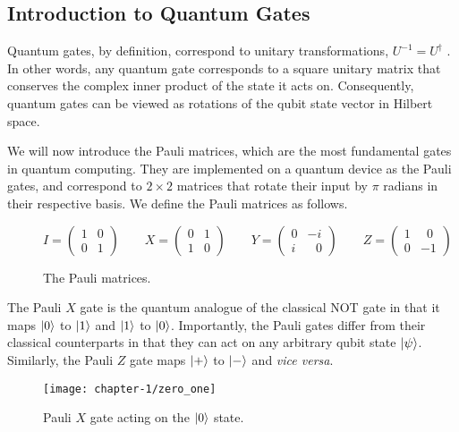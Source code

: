 \subsection{Introduction to Quantum Gates}%
\label{quantum-gates}

Quantum gates, by definition, correspond to unitary transformations, $U^{-1} = U^\dagger$ \cite{Nielsen2012}. In other words, any quantum gate corresponds to a square unitary matrix that conserves the complex inner product of the state it acts on. Consequently, quantum gates can be viewed as rotations of the qubit state vector in Hilbert space.

We will now introduce the Pauli matrices, which are the most fundamental gates in quantum computing. They are implemented on a quantum device as the Pauli gates, and correspond to $2 \times 2$ matrices that rotate their input by $\pi$ radians in their respective basis. We define the Pauli matrices as follows.

\begin{figure}[H]
    \centering
    \begin{equation*}
        I = \begin{pmatrix} 1 & 0 \\ 0 & 1\end{pmatrix} \qquad
        X = \begin{pmatrix} 0 & 1 \\ 1 & 0\end{pmatrix} \qquad
        Y = \begin{pmatrix} 0 & -i \\ i & \,\,\,\,0\end{pmatrix} \qquad
        Z = \begin{pmatrix} 1 & \,\,\,0 \\ 0 & -1\end{pmatrix}
    \end{equation*}
    \caption{The Pauli matrices.}
    \label{pauli-matrices}
\end{figure}

The Pauli $X$ gate is the quantum analogue of the classical NOT gate in that it maps $\ket 0$ to $\ket 1$ and $\ket 1$ to $\ket 0$. Importantly, the Pauli gates differ from their classical counterparts in that they can act on any arbitrary qubit state $\ket\psi$. Similarly, the Pauli $Z$ gate maps $\ket +$ to $\ket -$ and \textit{vice versa}.

\begin{figure}[H]
    \centering
    \texttt{[image: chapter-1/zero\_one]}
    \caption{Pauli $X$ gate acting on the $\ket 0$ state.}
\end{figure}

